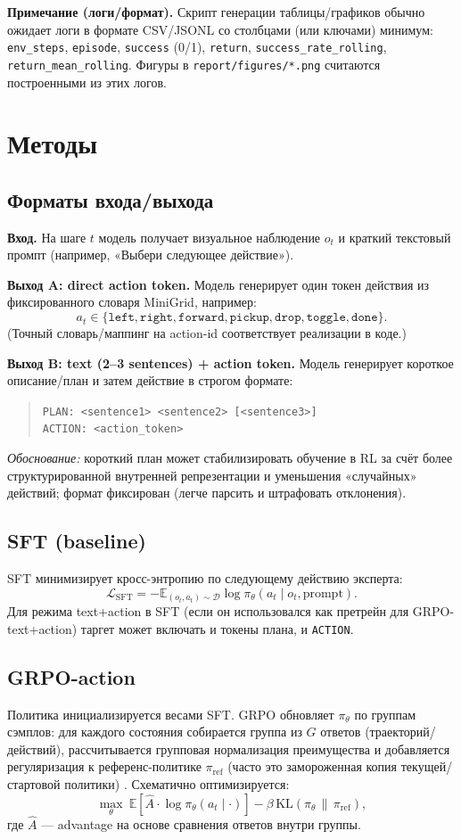 \documentclass[10pt,a4paper]{article}
\newcommand{\tok}[1]{\texttt{#1}}
\begin{document}
\smallskip
\textbf{Примечание (логи/формат).} Скрипт генерации таблицы/графиков обычно ожидает логи в формате CSV/JSONL со столбцами (или ключами) минимум:
\tok{env_steps}, \tok{episode}, \tok{success} (0/1), \tok{return}, \tok{success_rate_rolling}, \tok{return_mean_rolling}.
Фигуры в \tok{report/figures/*.png} считаются построенными из этих логов.

\section{Методы}

\subsection{Форматы входа/выхода}
\textbf{Вход.} На шаге $t$ модель получает визуальное наблюдение $o_t$ и краткий текстовый промпт (например, «Выбери следующее действие»).

\textbf{Выход A: direct action token.}
Модель генерирует один токен действия из фиксированного словаря MiniGrid, например:
\[
a_t \in \{\tok{left},\tok{right},\tok{forward},\tok{pickup},\tok{drop},\tok{toggle},\tok{done}\}.
\]
(Точный словарь/маппинг на action-id соответствует реализации в коде.)

\textbf{Выход B: text (2--3 sentences) + action token.}
Модель генерирует короткое описание/план и затем действие в строгом формате:
\begin{quote}\small
\tok{PLAN: <sentence1> <sentence2> [<sentence3>]}\\
\tok{ACTION: <action\_token>}
\end{quote}
\emph{Обоснование:} короткий план может стабилизировать обучение в RL за счёт более структурированной внутренней репрезентации и уменьшения «случайных» действий; формат фиксирован (легче парсить и штрафовать отклонения).

\subsection{SFT (baseline)}
SFT минимизирует кросс-энтропию по следующему действию эксперта:
\[
\mathcal{L}_{\text{SFT}} = -\mathbb{E}_{(o_t,a_t)\sim \mathcal{D}} \log \pi_\theta(a_t \mid o_t, \text{prompt}).
\]
Для режима text+action в SFT (если он использовался как претрейн для GRPO-text+action) таргет может включать и токены плана, и \tok{ACTION}.

\subsection{GRPO-action}
Политика инициализируется весами SFT.
GRPO обновляет $\pi_\theta$ по группам сэмплов: для каждого состояния собирается группа из $G$ ответов (траекторий/действий), рассчитывается групповая нормализация преимущества и добавляется регуляризация к референс-политике $\pi_{\text{ref}}$ (часто это замороженная копия текущей/стартовой политики) \citep{grpo}.
Схематично оптимизируется:
\[
\max_\theta \ \mathbb{E}\left[\hat{A}\cdot \log \pi_\theta(a_t\mid \cdot)\right] - \beta \, \mathrm{KL}\!\left(\pi_\theta \,\|\, \pi_{\text{ref}}\right),
\]
где $\hat{A}$ — advantage на основе сравнения ответов внутри группы.
\end{document}
